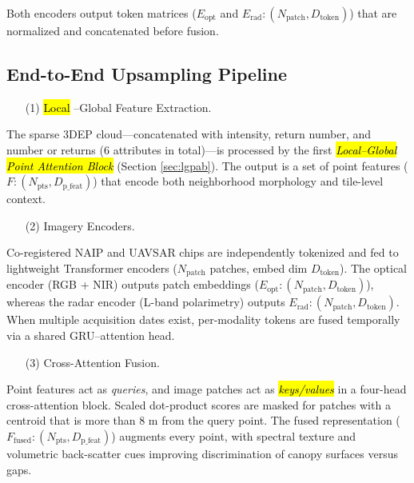 \documentclass[remotesensing,article,accept,pdftex,moreauthors]{Definitions/mdpi}
\begin{document}
Both encoders output token matrices ($E_{\text{opt}}$ and $E_{\text{rad}}: (N_{\text{patch}}, D_{\text{token}})$) that are normalized and concatenated before fusion.

\newpage

\subsection{End-to-End Upsampling Pipeline}
\label{sec:pipeline}


\begin{enumerate}
\item[(1)] {\hl{Local}%
–Global Feature Extraction.}
\end{enumerate}

The sparse 3DEP cloud—concatenated with intensity, return number, and number or returns (6 attributes in total)—is processed by the first \emph{\hl{Local–Global Point Attention Block}} (Section \ref{sec:lgpab}). The output is a set of point features ($F: (N_{\text{pts}}, D_{\text{p\_feat}})$) that encode both neighborhood morphology and tile-level context.


\begin{enumerate}
\item[(2)] {Imagery Encoders.}
\end{enumerate}

Co-registered NAIP and UAVSAR chips are independently tokenized and fed to lightweight Transformer encoders ($N_{\text{patch}}$ patches, embed dim $D_{\text{token}}$). The optical encoder (RGB + NIR) outputs patch embeddings ($E_{\text{opt}}: (N_{\text{patch}}, D_{\text{token}})$), whereas the radar encoder (L-band polarimetry) outputs $E_{\text{rad}}: (N_{\text{patch}}, D_{\text{token}})$. When multiple acquisition dates exist, per-modality tokens are fused temporally via a shared GRU–attention head.

\begin{enumerate}
\item[(3)] {Cross-Attention Fusion.}
\end{enumerate}

Point features act as \emph{queries}, and image patches act as \emph{\hl{keys/values}} %
in a four-head cross-attention block.
Scaled dot-product scores are masked for patches with a centroid that is more than 8 m from the query point. The fused representation ($F_{\text{fused}}: (N_{\text{pts}}, D_{\text{p\_feat}})$) augments every point, with spectral texture and volumetric back-scatter cues improving discrimination of canopy surfaces versus gaps.
\end{document}

